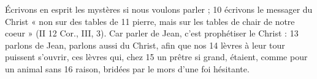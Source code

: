 Écrivons en esprit les mystères si nous voulons parler ;	 
10	 	écrivons le messager du Christ « non sur des tables de	 
11	 	pierre, mais sur les tables de chair de notre coeur » (II	 
12	 	Cor., III, 3). Car parler de Jean, c'est prophétiser le Christ :	 
13	 	parlons de Jean, parlons aussi du Christ, afin que nos	 
14	 	lèvres à leur tour puissent s'ouvrir, ces lèvres qui, chez	 
15	 	un prêtre si grand, étaient, comme pour un animal sans	 
16	 	raison, bridées par le mors d'une foi hésitante.